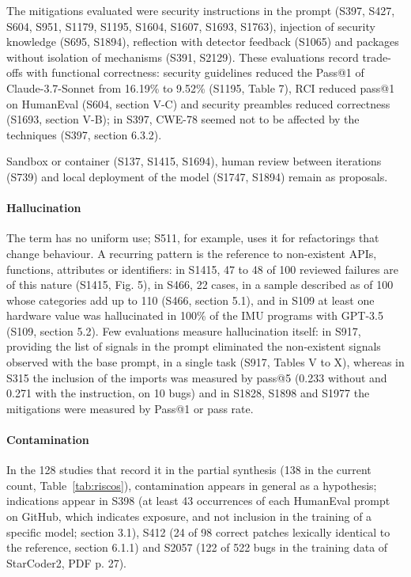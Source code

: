 The mitigations evaluated were security instructions in the prompt (S397, S427, S604, S951, S1179, S1195, S1604, S1607, S1693, S1763), injection of security knowledge (S695, S1894), reflection with detector feedback (S1065) and packages without isolation of mechanisms (S391, S2129).
These evaluations record trade-offs with functional correctness: security guidelines reduced the Pass@1 of Claude-3.7-Sonnet from 16.19\% to 9.52\% (S1195, Table 7), RCI reduced pass@1 on HumanEval (S604, section V-C) and security preambles reduced correctness (S1693, section V-B); in S397, CWE-78 seemed not to be affected by the techniques (S397, section 6.3.2).

Sandbox or container (S137, S1415, S1694), human review between iterations (S739) and local deployment of the model (S1747, S1894) remain as proposals.

\paragraph{Hallucination}
The term has no uniform use; S511, for example, uses it for refactorings that change behaviour.
A recurring pattern is the reference to non-existent APIs, functions, attributes or identifiers: in S1415, 47 to 48 of 100 reviewed failures are of this nature (S1415, Fig. 5), in S466, 22 cases, in a sample described as of 100 whose categories add up to 110 (S466, section 5.1), and in S109 at least one hardware value was hallucinated in 100\% of the IMU programs with GPT-3.5 (S109, section 5.2).
Few evaluations measure hallucination itself: in S917, providing the list of signals in the prompt eliminated the non-existent signals observed with the base prompt, in a single task (S917, Tables V to X), whereas in S315 the inclusion of the imports was measured by pass@5 (0.233 without and 0.271 with the instruction, on 10 bugs) and in S1828, S1898 and S1977 the mitigations were measured by Pass@1 or pass rate.

\paragraph{Contamination}
In the 128 studies that record it in the partial synthesis (138 in the current count, Table~\ref{tab:riscos}), contamination appears in general as a hypothesis; indications appear in S398 (at least 43 occurrences of each HumanEval prompt on GitHub, which indicates exposure, and not inclusion in the training of a specific model; section 3.1), S412 (24 of 98 correct patches lexically identical to the reference, section 6.1.1) and S2057 (122 of 522 bugs in the training data of StarCoder2, PDF p. 27).

